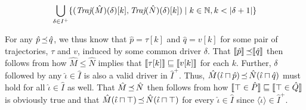 \begin{equation*}
\bigcup_{\delta \in I^{+}} \{ (\textit{Traj}(\hat M)(\delta)[k], \textit{Traj}(\hat N)(\delta)[k]) \mid k \in \mathbb{N}, k < | \delta + 1 | \}
\end{equation*}

\noindent For any $\hat p \operatorname{\mathrel{\preceq}} \hat q$, we thus know that $\hat p = \tau[k]$ and $\hat q = v[k]$ for some pair of trajectories, $\tau$ and $v$, induced by some common driver $\delta$. That $\llbracket\hat p\rrbracket \operatorname{\mathrel{\preceq}} \llbracket\hat q\rrbracket$ then follows from how $\hat M \leq \hat N$ implies that $\llbracket\tau[k]\rrbracket \sqsubseteq \llbracket v[k]\rrbracket$ for each $k$. Further, $\delta$ followed by any $\hat \iota \in \hat I$ is also a valid driver in $\hat I^{+}$. Thus, $\hat M(\hat \iota \sqcap \hat p) \operatorname{\mathrel{\preceq}} \hat N(\hat \iota \sqcap \hat q)$ must hold for all $\hat \iota \in \hat I$ as well. That $\hat M \operatorname{\mathrel{\preceq}} \hat N$ then follows from how $\llbracket\top \in \hat P\rrbracket \sqsubseteq \llbracket\top \in \hat Q\rrbracket$ is obviously true and that $\hat M(\hat \iota \sqcap \top) \operatorname{\mathrel{\preceq}} \hat N(\hat \iota \sqcap \top)$ for every $\hat \iota \in \hat I$ since $\langle \hat \iota \rangle \in \hat I^{+}$.



